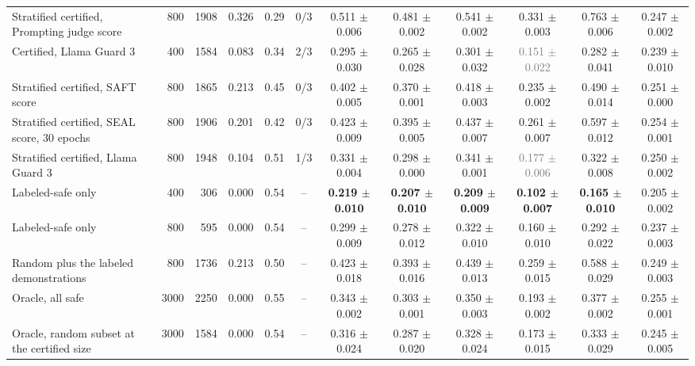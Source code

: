 \begin{tabular}{lrrccccccccc}
Stratified certified, Prompting judge score & 800 & 1908 & 0.326 & 0.29 & 0/3 & 0.511 $\pm$ 0.006 & 0.481 $\pm$ 0.002 & 0.541 $\pm$ 0.002 & 0.331 $\pm$ 0.003 & 0.763 $\pm$ 0.006 & 0.247 $\pm$ 0.002 \\
Certified, Llama Guard 3 & 400 & 1584 & 0.083 & 0.34 & 2/3 & 0.295 $\pm$ 0.030 & 0.265 $\pm$ 0.028 & 0.301 $\pm$ 0.032 & \textcolor{gray}{0.151 $\pm$ 0.022} & 0.282 $\pm$ 0.041 & 0.239 $\pm$ 0.010 \\
Stratified certified, SAFT score & 800 & 1865 & 0.213 & 0.45 & 0/3 & 0.402 $\pm$ 0.005 & 0.370 $\pm$ 0.001 & 0.418 $\pm$ 0.003 & 0.235 $\pm$ 0.002 & 0.490 $\pm$ 0.014 & 0.251 $\pm$ 0.000 \\
Stratified certified, SEAL score, 30 epochs & 800 & 1906 & 0.201 & 0.42 & 0/3 & 0.423 $\pm$ 0.009 & 0.395 $\pm$ 0.005 & 0.437 $\pm$ 0.007 & 0.261 $\pm$ 0.007 & 0.597 $\pm$ 0.012 & 0.254 $\pm$ 0.001 \\
Stratified certified, Llama Guard 3 & 800 & 1948 & 0.104 & 0.51 & 1/3 & 0.331 $\pm$ 0.004 & 0.298 $\pm$ 0.000 & 0.341 $\pm$ 0.001 & \textcolor{gray}{0.177 $\pm$ 0.006} & 0.322 $\pm$ 0.008 & 0.250 $\pm$ 0.002 \\
Labeled-safe only & 400 & 306 & 0.000 & 0.54 & -- & \textbf{0.219 $\pm$ 0.010} & \textbf{0.207 $\pm$ 0.010} & \textbf{0.209 $\pm$ 0.009} & \textbf{0.102 $\pm$ 0.007} & \textbf{0.165 $\pm$ 0.010} & 0.205 $\pm$ 0.002 \\
Labeled-safe only & 800 & 595 & 0.000 & 0.54 & -- & 0.299 $\pm$ 0.009 & 0.278 $\pm$ 0.012 & 0.322 $\pm$ 0.010 & 0.160 $\pm$ 0.010 & 0.292 $\pm$ 0.022 & 0.237 $\pm$ 0.003 \\
Random plus the labeled demonstrations & 800 & 1736 & 0.213 & 0.50 & -- & 0.423 $\pm$ 0.018 & 0.393 $\pm$ 0.016 & 0.439 $\pm$ 0.013 & 0.259 $\pm$ 0.015 & 0.588 $\pm$ 0.029 & 0.249 $\pm$ 0.003 \\
Oracle, all safe & 3000 & 2250 & 0.000 & 0.55 & -- & 0.343 $\pm$ 0.002 & 0.303 $\pm$ 0.001 & 0.350 $\pm$ 0.003 & 0.193 $\pm$ 0.002 & 0.377 $\pm$ 0.002 & 0.255 $\pm$ 0.001 \\
Oracle, random subset at the certified size & 3000 & 1584 & 0.000 & 0.54 & -- & 0.316 $\pm$ 0.024 & 0.287 $\pm$ 0.020 & 0.328 $\pm$ 0.024 & 0.173 $\pm$ 0.015 & 0.333 $\pm$ 0.029 & 0.245 $\pm$ 0.005 \\
\bottomrule
\end{tabular}
